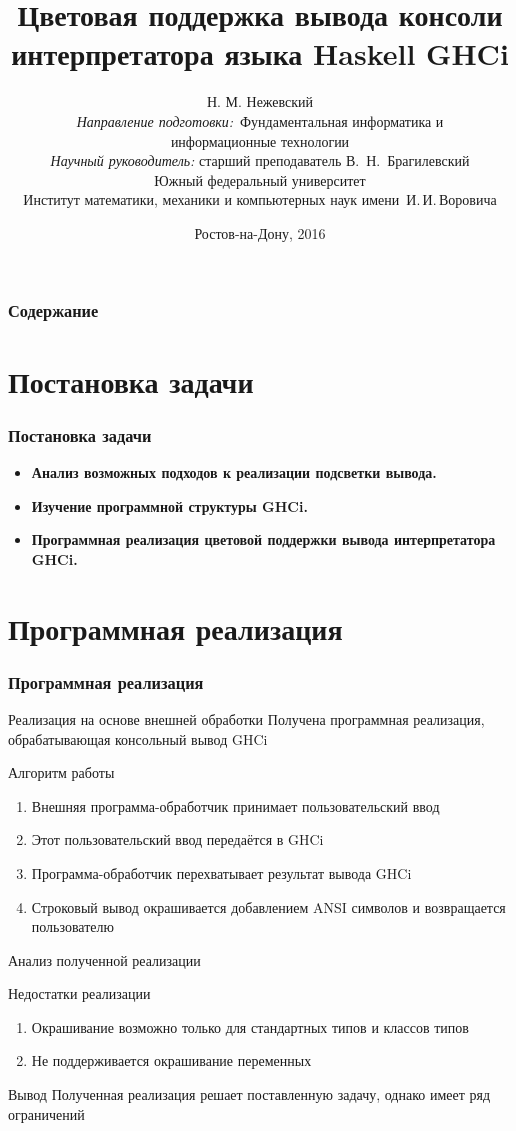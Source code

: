 \documentclass[utf8,russian]{beamer}
\title{\small{Цветовая поддержка вывода консоли интерпретатора языка Haskell GHCi}}
\author{\small{%
Н. М. Нежевский\\%
\emph{Направление подготовки:}~Фундаментальная информатика и \\информационные технологии\\%
\emph{Научный руководитель:} старший преподаватель В.~Н.~Брагилевский}\\%
\vspace{15pt}%
    Южный федеральный университет\\
    Институт математики, механики и компьютерных наук
    имени~И.\,И.\,Воровича%
}
\date{\small{Ростов-на-Дону, 2016}}
\begin{document}
\begin{frame}
\titlepage
\end{frame}

\begin{frame}
\frametitle{Содержание}
\tableofcontents
\end{frame}

\section{Постановка задачи}
\begin{frame}
\frametitle{Постановка задачи}
\begin{itemize}
  \item \textbf{Анализ возможных подходов к реализации подсветки вывода.}
  \item \textbf{Изучение программной структуры GHCi.}
  \item \textbf{Программная реализация цветовой поддержки вывода интерпретатора GHCi.} 
\end{itemize}
\end{frame}

\section{Программная реализация}
\begin{frame}
\frametitle{Программная реализация}

\begin{block}{Реализация на основе внешней обработки}
Получена программная реализация, обрабатывающая консольный вывод GHCi
\end{block}

\begin{block}{Алгоритм работы}
\begin{enumerate}
  \item Внешняя программа-обработчик принимает пользовательский ввод
  \item Этот пользовательский ввод передаётся в GHCi
  \item Программа-обработчик перехватывает результат вывода GHCi
  \item Строковый вывод окрашивается добавлением ANSI символов и возвращается пользователю
\end{enumerate}
\end{block}
\end{frame}
\begin{frame}{Анализ полученной реализации}
\begin{block}{Недостатки реализации}
\begin{enumerate}
  \item Окрашивание возможно только для стандартных типов и классов типов
  \item Не поддерживается окрашивание переменных
\end{enumerate}
\end{block}

\begin{block}{Вывод}
Полученная реализация решает поставленную задачу, однако имеет ряд ограничений
\end{block}

\end{frame}
\end{document}
